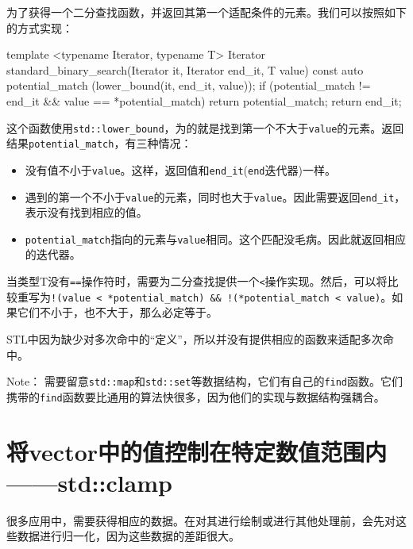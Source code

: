 为了获得一个二分查找函数，并返回其第一个适配条件的元素。我们可以按照如下的方式实现：

\begin{codebox}[cpp]
template <typename Iterator, typename T>
Iterator standard_binary_search(Iterator it, Iterator end_it, T value)
{
    const auto potential_match (lower_bound(it, end_it, value));
    if (potential_match != end_it && value == *potential_match) {
        return potential_match;
    }
    return end_it;
}
\end{codebox}

这个函数使用\texttt{std::lower\_bound}，为的就是找到第一个不大于\texttt{value}的元素。返回结果\texttt{potential\_match}，有三种情况：

\begin{itemize}
\item 没有值不小于\texttt{value}。这样，返回值和\texttt{end\_it}(\texttt{end}迭代器)一样。

\item 遇到的第一个不小于\texttt{value}的元素，同时也大于\texttt{value}。因此需要返回\texttt{end\_it}，表示没有找到相应的值。

\item \texttt{potential\_match}指向的元素与\texttt{value}相同。这个匹配没毛病。因此就返回相应的迭代器。

\end{itemize}

当类型T没有\texttt{==}操作符时，需要为二分查找提供一个\texttt{<}操作实现。然后，可以将比较重写为\texttt{!(value < *potential\_match) \&\& !(*potential\_match < value)}。如果它们不小于，也不大于，那么必定等于。

STL中因为缺少对多次命中的“定义”，所以并没有提供相应的函数来适配多次命中。

\begin{myInfoBox}
Note： 需要留意\texttt{std::map}和\texttt{std::set}等数据结构，它们有自己的\texttt{find}函数。它们携带的\texttt{find}函数要比通用的算法快很多，因为他们的实现与数据结构强耦合。
\end{myInfoBox}


\section{将vector中的值控制在特定数值范围内——std::clamp}

很多应用中，需要获得相应的数据。在对其进行绘制或进行其他处理前，会先对这些数据进行归一化，因为这些数据的差距很大。

